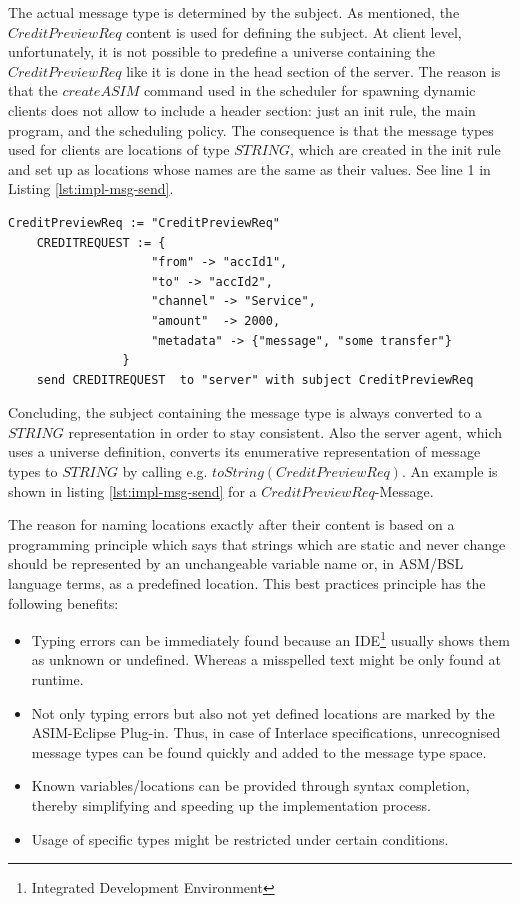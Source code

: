 The actual message type is determined by the subject. As mentioned, the $CreditPreviewReq$ content is used for defining the subject. At client level, unfortunately, it is not possible to predefine a universe containing the $CreditPreviewReq$ like it is done in the head section of the server. The reason is that the $createASIM$ command used in the scheduler for spawning dynamic clients does not allow to include a header section: just an init rule, the main program, and the scheduling policy. The consequence is that the message types used for clients are locations of type $STRING$, which are created in the init rule and set up as locations whose names are the same as their values. See line 1 in Listing \ref{lst:impl-msg-send}.

\begin{center}
\begin{minipage}{0.8\textwidth}
\small
\begin{lstlisting}[language=bsl_lst,caption={\bf\small send message},label={lst:impl-msg-send} ]
	CreditPreviewReq := "CreditPreviewReq"
	CREDITREQUEST := {
					"from" -> "accId1",
					"to" -> "accId2",
					"channel" -> "Service",
					"amount"  -> 2000,
					"metadata" -> {"message", "some transfer"}
				}
	send CREDITREQUEST  to "server" with subject CreditPreviewReq
\end{lstlisting}
\end{minipage}
\end{center}

Concluding, the subject containing the message type is always converted to a $STRING$ representation in order to stay consistent. Also the server agent, which uses a universe definition, converts its enumerative representation of message types to $STRING$ by calling e.g. $toString(CreditPreviewReq)$. An example is shown in listing \ref{lst:impl-msg-send} for a $CreditPreviewReq$-Message.

The reason for naming locations exactly after their content is based on a programming principle which says that strings which are static and never change should be represented by an unchangeable variable name or, in ASM/BSL language terms, as a predefined location. This best practices principle has the following benefits:

\begin{itemize}
	\item Typing errors can be immediately found because an IDE\footnote{Integrated Development Environment} usually shows them as unknown or undefined. Whereas a misspelled text might be only found at runtime.
	\item Not only typing errors but also not yet defined locations are marked by the ASIM-Eclipse Plug-in. Thus, in case of Interlace specifications, unrecognised message types can be found quickly and added to the message type space.
	\item Known variables/locations can be provided through syntax completion, thereby simplifying and speeding up the implementation process.
	\item Usage of specific types might be restricted under certain conditions.
\end{itemize}

